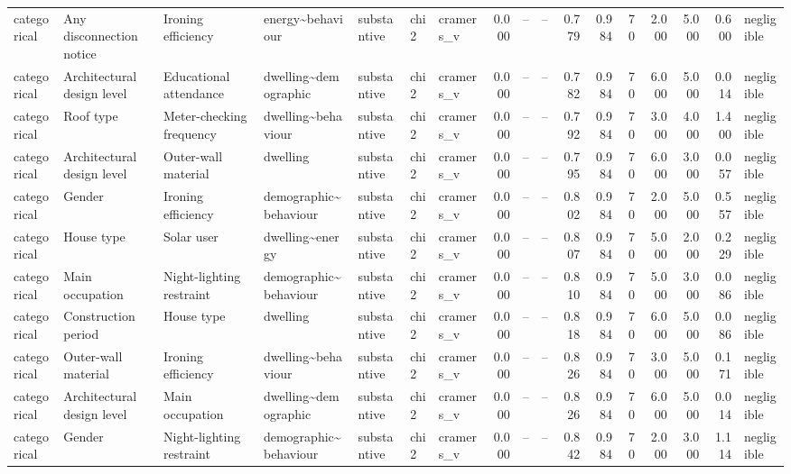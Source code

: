 \begin{table}
\begin{tabular}{lllllllrrrrrrrrrl}
categorical & Any disconnection notice & Ironing efficiency & energy\textasciitilde behaviour & substantive & chi2 & cramers\_v & 0.000 & -- & -- & 0.779 & 0.984 & 70 & 2.000 & 5.000 & 0.600 & negligible \\
categorical & Architectural design level & Educational attendance & dwelling\textasciitilde demographic & substantive & chi2 & cramers\_v & 0.000 & -- & -- & 0.782 & 0.984 & 70 & 6.000 & 5.000 & 0.014 & negligible \\
categorical & Roof type & Meter-checking frequency & dwelling\textasciitilde behaviour & substantive & chi2 & cramers\_v & 0.000 & -- & -- & 0.792 & 0.984 & 70 & 3.000 & 4.000 & 1.400 & negligible \\
categorical & Architectural design level & Outer-wall material & dwelling & substantive & chi2 & cramers\_v & 0.000 & -- & -- & 0.795 & 0.984 & 70 & 6.000 & 3.000 & 0.057 & negligible \\
categorical & Gender & Ironing efficiency & demographic\textasciitilde behaviour & substantive & chi2 & cramers\_v & 0.000 & -- & -- & 0.802 & 0.984 & 70 & 2.000 & 5.000 & 0.557 & negligible \\
categorical & House type & Solar user & dwelling\textasciitilde energy & substantive & chi2 & cramers\_v & 0.000 & -- & -- & 0.807 & 0.984 & 70 & 5.000 & 2.000 & 0.229 & negligible \\
categorical & Main occupation & Night-lighting restraint & demographic\textasciitilde behaviour & substantive & chi2 & cramers\_v & 0.000 & -- & -- & 0.810 & 0.984 & 70 & 5.000 & 3.000 & 0.086 & negligible \\
categorical & Construction period & House type & dwelling & substantive & chi2 & cramers\_v & 0.000 & -- & -- & 0.818 & 0.984 & 70 & 6.000 & 5.000 & 0.086 & negligible \\
categorical & Outer-wall material & Ironing efficiency & dwelling\textasciitilde behaviour & substantive & chi2 & cramers\_v & 0.000 & -- & -- & 0.826 & 0.984 & 70 & 3.000 & 5.000 & 0.171 & negligible \\
categorical & Architectural design level & Main occupation & dwelling\textasciitilde demographic & substantive & chi2 & cramers\_v & 0.000 & -- & -- & 0.826 & 0.984 & 70 & 6.000 & 5.000 & 0.014 & negligible \\
categorical & Gender & Night-lighting restraint & demographic\textasciitilde behaviour & substantive & chi2 & cramers\_v & 0.000 & -- & -- & 0.842 & 0.984 & 70 & 2.000 & 3.000 & 1.114 & negligible \\

\end{tabular}
\end{table}
